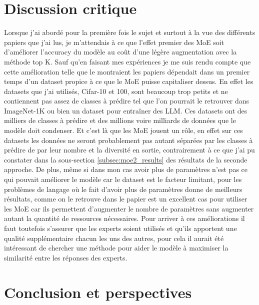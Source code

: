 \documentclass{article}
\begin{document}
\section{Discussion critique}

Lorsque j'ai abordé pour la première fois le sujet et surtout à la vue des différents papiers que j'ai lus, je m'attendais à ce que l'effet premier des MoE soit d'améliorer l'accuracy du modèle au coût d'une légère augmentation avec la méthode top K. Sauf qu'en faisant mes expériences je me suis rendu compte que cette amélioration telle que le montraient les papiers dépendait dans un premier temps d'un dataset propice à ce que le MoE puisse capitaliser dessus. En effet les datasets que j'ai utilisés,  Cifar-10 et 100, sont beaucoup trop petits et ne contiennent pas assez de classes à prédire tel que l'on pourrait le retrouver dans ImageNet-1K ou bien un dataset pour entraîner des LLM. Ces datasets ont des milliers de classes à prédire et des millions voire milliards de données que le modèle doit condenser. Et c'est là que les MoE jouent un rôle, en effet sur ces datasets les données ne seront probablement pas autant séparées par les classes à prédire de par leur nombre et la diversité en sortie, contrairement à ce que j'ai pu constater dans la sous-section \ref{subsec:moe2_results} des résultats de la seconde approche. De plus, même si dans mon cas avoir plus de paramètres n'est pas ce qui pouvait améliorer le modèle car le dataset est le facteur limitant, pour les problèmes de langage où le fait d'avoir plus de paramètres donne de meilleurs résultats, comme on le retrouve dans le papier \cite{paper2} est un excellent cas pour utiliser les MoE car ils permettent d'augmenter le nombre de paramètres sans augmenter autant la quantité de ressources nécessaires. Pour arriver à ces améliorations il faut toutefois s'assurer que les experts soient utilisés et qu'ils apportent une qualité supplémentaire chacun les uns des autres, pour cela il aurait été intéressant de chercher une méthode pour aider le modèle à maximiser la similarité entre les réponses des experts.

\section{Conclusion et perspectives}
\end{document}

